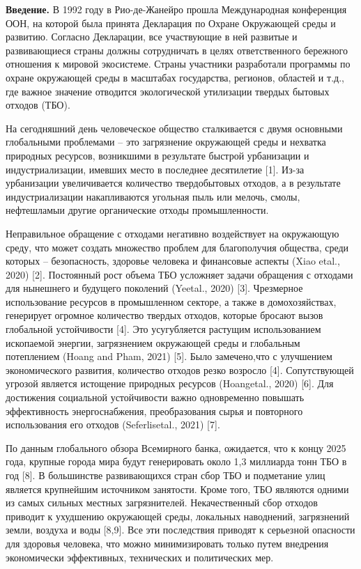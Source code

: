 \begin{multicols}{2}
{\bfseries Введение.} В 1992 году в Рио-де-Жанейро прошла Международная
конференция ООН, на которой была принята Декларация по Охране Окружающей
среды и развитию. Согласно Декларации, все участвующие в ней развитые и
развивающиеся страны должны сотрудничать в целях ответственного
бережного отношения к мировой экосистеме. Страны участники разработали
программы по охране окружающей среды в масштабах государства, регионов,
областей и т.д., где важное значение отводится экологической утилизации
твердых бытовых отходов (ТБО).

На сегодняшний день человеческое общество сталкивается с двумя основными
глобальными проблемами -- это загрязнение окружающей среды и нехватка
природных ресурсов, возникшими в результате быстрой урбанизации и
индустриализации, имевших место в последнее десятилетие {[}1{]}. Из-за
урбанизации увеличивается количество твердобытовых отходов, а в
результате индустриализации накапливаются угольная пыль или мелочь,
смолы, нефтешламыи другие органические отходы промышленности.

Неправильное обращение с отходами негативно воздействует на окружающую
среду, что может создать множество проблем для благополучия общества,
среди которых -- безопасность, здоровье человека и финансовые аспекты
(Xiao etal., 2020) {[}2{]}. Постоянный рост объема ТБО усложняет задачи
обращения с отходами для нынешнего и будущего поколений (Yeetal., 2020)
{[}3{]}. Чрезмерное использование ресурсов в промышленном секторе, а
также в домохозяйствах, генерирует огромное количество твердых отходов,
которые бросают вызов глобальной устойчивости {[}4{]}. Это усугубляется
растущим использованием ископаемой энергии, загрязнением окружающей
среды и глобальным потеплением (Hoang and Pham, 2021) {[}5{]}. Было
замечено,что с улучшением экономического развития, количество отходов
резко возросло {[}4{]}. Сопутствующей угрозой является истощение
природных ресурсов (Hoangetal., 2020) {[}6{]}. Для достижения социальной
устойчивости важно одновременно повышать эффективность энергоснабжения,
преобразования сырья и повторного использования его отходов
(Seferlisetal., 2021) {[}7{]}.

По данным глобального обзора Всемирного банка, ожидается, что к концу
2025 года, крупные города мира будут генерировать около 1,3 миллиарда
тонн ТБО в год {[}8{]}. В большинстве развивающихся стран сбор ТБО и
подметание улиц является крупнейшим источником занятости. Кроме того,
ТБО являются одними из самых сильных местных загрязнителей.
Некачественный сбор отходов приводит к ухудшению окружающей среды,
локальных наводнений, загрязнений земли, воздуха и воды {[}8,9{]}. Все
эти последствия приводят к серьезной опасности для здоровья человека,
что можно минимизировать только путем внедрения экономически
эффективных, технических и политических мер.


\end{multicols}
